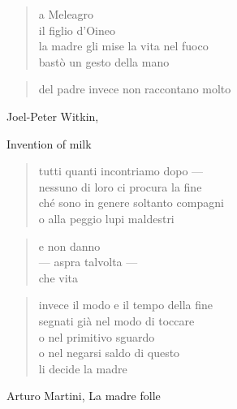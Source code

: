 \begin{volumetitlepage}
\end{volumetitlepage}


	\begin{verse}
		a Meleagro\\
		il figlio d'Oineo\\
		la madre gli mise la vita nel fuoco\\
		bastò un gesto della mano
	\end{verse}

	\begin{verse}
		del padre invece non raccontano molto
	\end{verse}

\clearpage


\begin{artItem}
	Joel-Peter Witkin, \begin{otherlanguage}{english}%
		Invention of milk%
	\end{otherlanguage}
\end{artItem}

	\begin{verse}
		tutti quanti incontriamo dopo —\\
		nessuno di loro ci procura la fine\\
		ché sono in genere soltanto compagni\\
		o alla peggio lupi maldestri
	\end{verse}

	\begin{verse}
		e non danno\\
		— aspra talvolta —\\
		che vita
	\end{verse}

	\begin{verse}
		invece il modo e il tempo della fine\\
		segnati già nel modo di toccare\\
		o nel primitivo sguardo\\
		o nel negarsi saldo di questo\\
		li decide la madre
	\end{verse}

\clearpage


\begin{artItem}
	Arturo Martini, La madre folle
\end{artItem}

